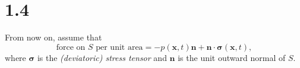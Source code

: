 \section{1.4}
\label{sec:1.4}

\begin{asm}
  \label{asm:surfaceForceViscous}
  From now on,
  assume that
  \begin{equation}
    \label{eq:surfaceForceSigma}
    \text{force on $S$ per unit area} = -p(\mathbf{x},t)\mathbf{n}+\mathbf{n}\cdot\boldsymbol\sigma(\mathbf{x},t),
  \end{equation}
  where $\boldsymbol\sigma$ is the \emph{(deviatoric) stress tensor} and
  $\mathbf{n}$ is the unit outward normal of $S$.
\end{asm}

